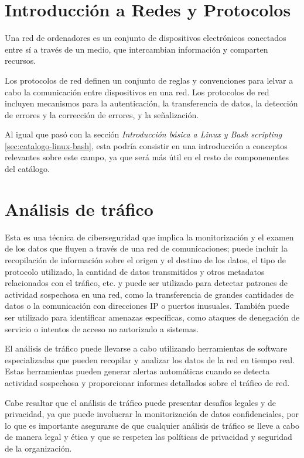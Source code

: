     
    \section{Introducción a Redes y Protocolos}

        Una red de ordenadores es un conjunto de dispositivos electrónicos conectados entre sí a través de un medio, que intercambian información y comparten recursos.
        
        Los protocolos de red definen un conjunto de reglas y convenciones para lelvar a cabo la comunicación entre dispositivos en una red. Los protocolos de red incluyen mecanismos para la autenticación, la transferencia de datos, la detección de errores y la corrección de errores, y la señalización.

        Al igual que pasó con la sección \textit{Introducción básica a Linux y Bash scripting} \ref{sec:catalogo-linux-bash}, esta podría consistir en una introducción a conceptos relevantes sobre este campo, ya que será más útil en el resto de componenentes del catálogo.

        
    \section{Análisis de tráfico}
        
        Esta es una técnica de ciberseguridad que implica la monitorización y el examen de los datos que fluyen a través de una red de comunicaciones; puede incluir la recopilación de información sobre el origen y el destino de los datos, el tipo de protocolo utilizado, la cantidad de datos transmitidos y otros metadatos relacionados con el tráfico, etc. y puede ser utilizado para detectar patrones de actividad sospechosa en una red, como la transferencia de grandes cantidades de datos o la comunicación con direcciones IP o puertos inusuales. También puede ser utilizado para identificar amenazas específicas, como ataques de denegación de servicio o intentos de acceso no autorizado a sistemas.
        
        El análisis de tráfico puede llevarse a cabo utilizando herramientas de software especializadas que pueden recopilar y analizar los datos de la red en tiempo real. Estas herramientas pueden generar alertas automáticas cuando se detecta actividad sospechosa y proporcionar informes detallados sobre el tráfico de red.
        
        Cabe resaltar que el análisis de tráfico puede presentar desafíos legales y de privacidad, ya que puede involucrar la monitorización de datos confidenciales, por lo que es importante asegurarse de que cualquier análisis de tráfico se lleve a cabo de manera legal y ética y que se respeten las políticas de privacidad y seguridad de la organización.

